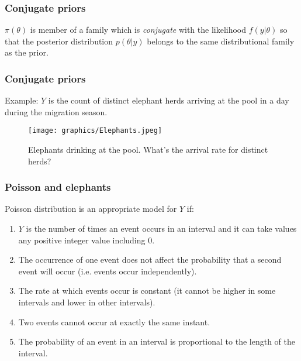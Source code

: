 \documentclass{beamer}
\newcommand{\1}{\ensuremath{\mathbf{1}}}
\begin{document}
%
%
%
\begin{frame}\frametitle{Conjugate priors}
	\begin{block}{}
		$\pi(\theta)$ is member of a family which is \emph{conjugate} with the likelihood $f(y|\theta)$ so that the posterior distribution $p(\theta|y)$ belongs to the same distributional family as the prior.
	\end{block}
\end{frame}
%
%
%
\begin{frame}\frametitle{Conjugate priors}
	Example: $Y$ is the count of distinct elephant herds arriving at the pool in a day during the migration season.
	\begin{figure}
	\begin{center}
		\texttt{[image: graphics/Elephants.jpeg]}
	\end{center}
	\caption{Elephants drinking at the pool. What’s the arrival rate for distinct herds?}
	\end{figure}
\end{frame}
%
%
%
\begin{frame}\frametitle{Poisson and elephants}
	Poisson distribution is an appropriate model for $Y$ if:
	\begin{enumerate}
		\item $Y$ is the number of times an event occurs in an interval and it can take values any positive integer value including 0.
		\item The occurrence of one event does not affect the probability that a second event will occur (i.e. events occur independently).
		\item The rate at which events occur is constant (it cannot be higher in some intervals and lower in other intervals).
		\item Two events cannot occur at exactly the same instant.
		\item The probability of an event in an interval is proportional to the length of the interval.
	\end{enumerate}
\end{frame}
\end{document}
